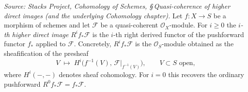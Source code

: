 \begin{definition}
  \label{def:higher_direct_image}
  \textit{Source: Stacks Project, Cohomology of Schemes, \S\,Quasi-coherence of
  higher direct images (and the underlying Cohomology chapter).}
  Let \(f : X \to S\) be a morphism of schemes and let \(\mathcal{F}\) be a
  quasi-coherent \(\mathcal{O}_X\)-module. For \(i \geq 0\) the \emph{\(i\)-th
  higher direct image} \(R^i f_*\mathcal{F}\) is the \(i\)-th right derived functor
  of the pushforward functor \(f_*\) applied to \(\mathcal{F}\). Concretely,
  \(R^i f_*\mathcal{F}\) is the \(\mathcal{O}_S\)-module obtained as the
  sheafification of the presheaf
  \[
    V \;\longmapsto\; H^i\bigl(f^{-1}(V),\, \mathcal{F}|_{f^{-1}(V)}\bigr),
    \qquad V \subset S \text{ open},
  \]
  where \(H^i(-, -)\) denotes sheaf cohomology. For \(i = 0\) this recovers the
  ordinary pushforward \(R^0 f_*\mathcal{F} = f_*\mathcal{F}\).
\end{definition}

